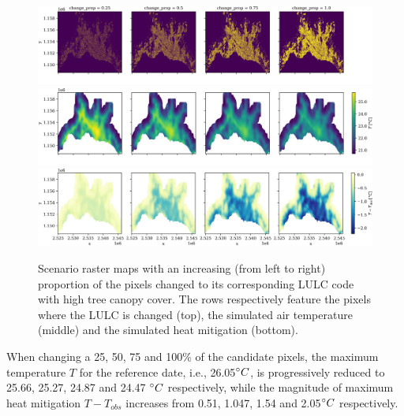 \documentclass[10pt,letterpaper]{article}
\begin{document}
\begin{figure}
  \begin{adjustwidth}{-.4\textwidth}{0cm}
    \includegraphics[width=\linewidth]{figures/scenario-lulc-maps.png}
    \includegraphics[width=\linewidth]{figures/scenario-T-maps.png}
    \includegraphics[width=\linewidth]{figures/scenario-heat-mitigation-maps.png}
    \caption{\label{fig:scenario-maps} Scenario raster maps with an increasing (from left to right) proportion of the pixels changed to its corresponding LULC code with high tree canopy cover. The rows respectively feature the pixels where the LULC is changed (top), the simulated air temperature (middle) and the simulated heat mitigation (bottom).}  
  \end{adjustwidth}
\end{figure}
When changing a 25, 50, 75 and 100\% of the candidate pixels, the maximum temperature $T$ for the reference date, i.e., 26.05$\degree C$, is progressively reduced to 25.66, 25.27, 24.87 and 24.47 $\degree C$ respectively, while the magnitude of maximum heat mitigation $T - T_{obs}$ increases from 0.51, 1.047, 1.54 and 2.05$\degree C$ respectively.
\end{document}
